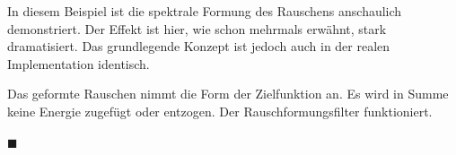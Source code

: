 In diesem Beispiel ist die spektrale Formung des Rauschens anschaulich
demonstriert. Der Effekt ist hier, wie schon mehrmals erwähnt, stark
dramatisiert. Das grundlegende Konzept ist jedoch auch in der realen
Implementation identisch.

Das geformte Rauschen nimmt die Form der Zielfunktion an. Es wird in
Summe keine Energie zugefügt oder entzogen. Der Rauschformungsfilter
funktioniert.

\hfill\(\blacksquare\)
